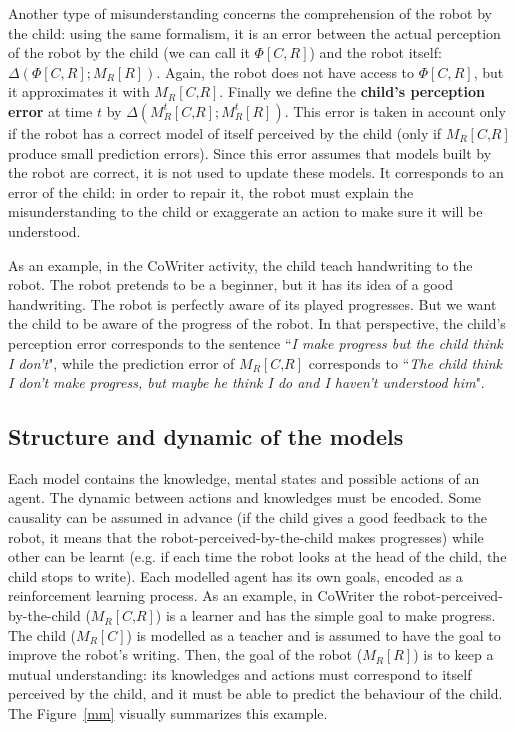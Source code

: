 \documentclass[10pt,a4paper]{article}
\begin{document}
Another type of misunderstanding concerns the comprehension of the robot by the child: using the same formalism, it is an error between the actual perception of the robot by the child (we can call it $\Phi[C,R]$) and the robot itself: $\Delta \left(\Phi[C,R] ; M_R\left[\textit{R}\right]\right)$. Again, the robot does not have access to $\Phi[C,R]$, but it approximates it with $ M_R\left[\textit{C,R}\right]$. Finally we define the \textbf{child's perception error} at time $t$ by $\Delta \left(M^t_R\left[\textit{C,R}\right] ; M^t_R\left[\textit{R}\right]\right)$. This error is taken in account only if the robot has a correct model of itself perceived by the child (only if $M_R\left[\textit{C,R}\right]$ produce small prediction errors). Since this error assumes that models built by the robot are correct, it is not used to update these models. It corresponds to an error of the child: in order to repair it, the robot must explain the misunderstanding to the child or exaggerate an action to make sure it will be understood.

As an example, in the CoWriter activity, the child teach handwriting to the robot. The robot pretends to be a beginner, but it has its idea of a good handwriting. The robot is perfectly aware of its played progresses. But we want the child to be aware of the progress of the robot. In that perspective, the child's perception error corresponds to the sentence ``\textit{I make progress but the child think I don't}", while the prediction error of $M_R\left[\textit{C,R}\right]$ corresponds to ``\textit{The child think I don't make progress, but maybe he think I do and I haven't understood him}".  

\subsection{Structure and dynamic of the models}
Each model contains the knowledge, mental states and possible actions of an agent. The dynamic between actions and knowledges must be encoded. Some causality can be assumed in advance (if the child gives a good feedback to the robot, it means that the robot-perceived-by-the-child makes progresses) while other can be learnt (e.g. if each time the robot looks at the head of the child, the child stops to write). Each modelled agent has its own goals, encoded as a reinforcement learning process. As an example, in CoWriter the robot-perceived-by-the-child ($ M_R\left[\textit{C,R}\right]$) is a learner and has the simple goal to make progress. The child ($ M_R\left[\textit{C}\right]$) is modelled as a teacher and is assumed to have the goal to improve the robot's writing. Then, the goal of the robot ($ M_R\left[\textit{R}\right]$) is to keep a mutual understanding: its knowledges and actions must correspond to itself perceived by the child, and it must be able to predict the behaviour of the child. The Figure~\ref{mm} visually summarizes this example.
\end{document}
